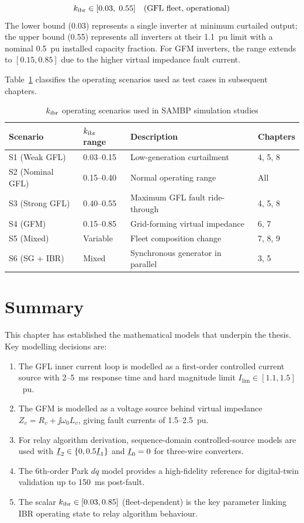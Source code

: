 \begin{equation}
  k_{\mathrm{ibr}} \in [0.03,\; 0.55] \quad \text{(GFL fleet, operational)}
  \label{eq:ch2_kibr_range}
\end{equation}
The lower bound (0.03) represents a single inverter at minimum curtailed
output; the upper bound (0.55) represents all inverters at their 1.1~pu
limit with a nominal 0.5~pu installed capacity fraction.
For GFM inverters, the range extends to $[0.15, 0.85]$ due to the higher
virtual impedance fault current.

Table~\ref{tab:ch2_kibr_scenarios} classifies the operating scenarios used
as test cases in subsequent chapters.

\begin{table}[htbp]
\caption{$k_{\mathrm{ibr}}$ operating scenarios used in SAMBP simulation studies}
\label{tab:ch2_kibr_scenarios}
\begin{tabularx}{\textwidth}{@{}lXXl@{}}
\toprule
Scenario & $k_{\mathrm{ibr}}$ range & Description & Chapters \\
\midrule
S1 (Weak GFL) & 0.03--0.15 & Low-generation curtailment & 4, 5, 8 \\
S2 (Nominal GFL) & 0.15--0.40 & Normal operating range & All \\
S3 (Strong GFL) & 0.40--0.55 & Maximum GFL fault ride-through & 4, 5, 8 \\
S4 (GFM) & 0.15--0.85 & Grid-forming virtual impedance & 6, 7 \\
S5 (Mixed) & Variable & Fleet composition change & 7, 8, 9 \\
S6 (SG + IBR) & Mixed & Synchronous generator in parallel & 3, 5 \\
\bottomrule
\end{tabularx}
\end{table}

\section{Summary}
\label{sec:ch2_summary}

This chapter has established the mathematical models that underpin the
thesis. Key modelling decisions are:

\begin{enumerate}
\item The GFL inner current loop is modelled as a first-order controlled
      current source with 2--5~ms response time and hard magnitude limit
      $I_\mathrm{lim} \in [1.1, 1.5]$~pu.
\item The GFM is modelled as a voltage source behind virtual impedance
      $Z_v = R_v + \jj\omega_0 L_v$, giving fault currents of 1.5--2.5~pu.
\item For relay algorithm derivation, sequence-domain controlled-source
      models are used with $\underline{I}_2 \in \{0, 0.5\underline{I}_1\}$ and
      $\underline{I}_0 = 0$ for three-wire converters.
\item The 6th-order Park $dq$ model provides a high-fidelity reference
      for digital-twin validation up to 150~ms post-fault.
\item The scalar $k_{\mathrm{ibr}} \in [0.03, 0.85]$ (fleet-dependent) is the key
      parameter linking IBR operating state to relay algorithm behaviour.
\end{enumerate}
